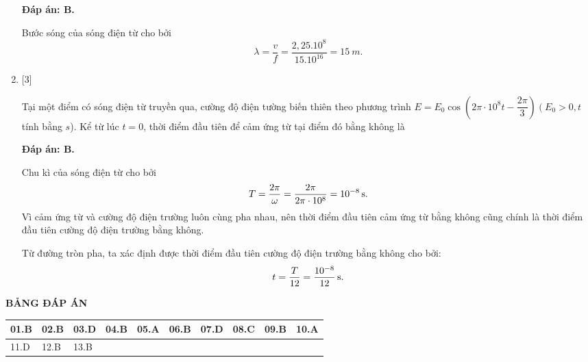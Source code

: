\begin{enumerate}[label=\bfseries Câu \arabic*:]
	\loigiai
	{		\textbf{Đáp án: B.}
		
Bước sóng của sóng điện từ cho bởi
$$
\lambda=\dfrac{v}{f}=\dfrac{2,25.10^{8}}{15.10^{16}}= \SI{15}{m}.
$$
		
	}

	\item {} [3]
	
	\cauhoi
	{Tại một điểm có sóng điện từ truyền qua, cường độ điện tường biến thiên theo phương trình $E=E_{0} \cos \left(2 \pi \cdot 10^{8} t-\dfrac{2 \pi}{3}\right)\left(E_{0}>0, t\right.$ tính bằng $s$). Kể từ lúc $t=0$, thời điểm đầu tiên để cảm ứng từ tại điểm đó bằng không là
	}
	
	\loigiai
	{		\textbf{Đáp án: B.}
		
Chu kì của sóng điện từ cho bởi
$$
T=\dfrac{2 \pi}{\omega}=\dfrac{2 \pi}{2 \pi \cdot 10^{8}}= \xsi{10^{-8}}{s}.
$$
Vì cảm ứng từ và cường độ điện trường luôn cùng pha nhau, nên thời điểm đầu tiên cảm ứng từ bằng không cũng chính là thời điểm đầu tiên cường độ điện trường bằng không.

Từ đường tròn pha, ta xác định được thời điểm đầu tiên cường độ điện trường bằng không cho bởi:
$$
t=\dfrac{T}{12}= \xsi{\dfrac{10^{-8}}{12}}{s}.
$$
	}
	
\end{enumerate}

\loigiai
{
	\begin{center}
		\textbf{BẢNG ĐÁP ÁN}
	\end{center}
	\begin{center}
		\begin{tabular}{|m{2.8em}|m{2.8em}|m{2.8em}|m{2.8em}|m{2.8em}|m{2.8em}|m{2.8em}|m{2.8em}|m{2.8em}|m{2.8em}|}
			\hline
			01.B  & 02.B  & 03.D  & 04.B  & 05.A  & 06.B  & 07.D & 08.C & 09.B & 10.A \\
			\hline
			11.D  & 12.B  & 13.B  &       &       &       &      &      &      & \\
			\hline
			
		\end{tabular}
	\end{center}
}

